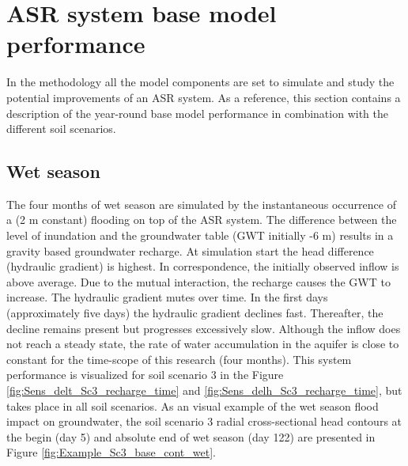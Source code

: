 
\section{ASR system base model performance}
\label{section:Base_model_perf}
In the methodology all the model components are set to simulate and study the potential improvements of an ASR system. As a reference, this section contains a description of the year-round base model performance in combination with the different soil scenarios.

\subsection{Wet season}
The four months of wet season are simulated by the instantaneous occurrence of a (2 m constant) flooding on top of the ASR system. The difference between the level of inundation and the groundwater table (GWT initially -6 m) results in a gravity based groundwater recharge. At simulation start the head difference (hydraulic gradient) is highest. In correspondence, the initially observed inflow is above average. Due to the mutual interaction, the recharge causes the GWT to increase. The hydraulic gradient mutes over time. In the first days (approximately five days) the hydraulic gradient declines fast. Thereafter, the decline remains present but progresses excessively slow. Although the inflow does not reach a steady state, the rate of water accumulation in the aquifer is close to constant for the time-scope of this research (four months). This system performance is visualized for soil scenario 3 in the Figure \ref{fig:Sens_delt_Sc3_recharge_time} and \ref{fig:Sens_delh_Sc3_recharge_time}, but takes place in all soil scenarios. As an visual example of the wet season flood impact on groundwater, the soil scenario 3 radial cross-sectional head contours at the begin (day 5) and absolute end of wet season (day 122) are presented in Figure \ref{fig:Example_Sc3_base_cont_wet}.

